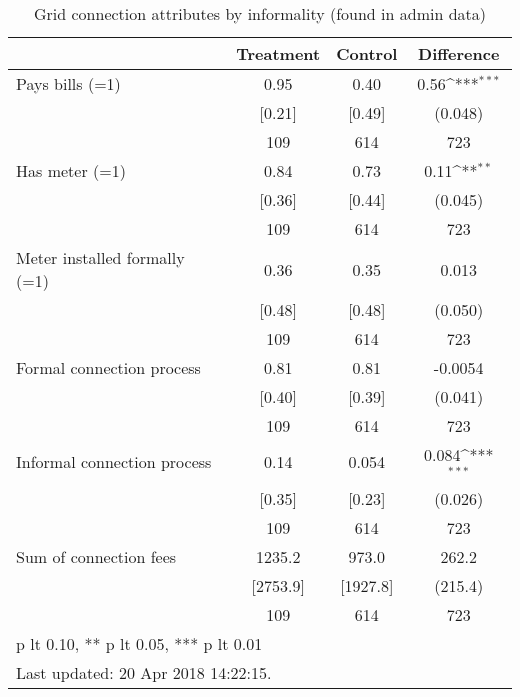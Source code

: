 \begin{table}[htbp]\centering
\def\sym#1{\ifmmode^{#1}\else\(^{#1}\)\fi}
\caption{Grid connection attributes by informality (found in admin data) \label{tab:"balance"}}
\begin{tabular*}{0.9\hsize}{@{\hskip\tabcolsep\extracolsep\fill}l*{1}{ccc}}
\toprule
                                &Treatment&  Control&Difference         \\
\midrule
Pays bills (=1)                 &     0.95&     0.40&     0.56\sym{***}\\
                                &   [0.21]&   [0.49]&  (0.048)         \\
                                &      109&      614&      723         \\
Has meter (=1)                  &     0.84&     0.73&     0.11\sym{**} \\
                                &   [0.36]&   [0.44]&  (0.045)         \\
                                &      109&      614&      723         \\
Meter installed formally (=1)   &     0.36&     0.35&    0.013         \\
                                &   [0.48]&   [0.48]&  (0.050)         \\
                                &      109&      614&      723         \\
Formal connection process       &     0.81&     0.81&  -0.0054         \\
                                &   [0.40]&   [0.39]&  (0.041)         \\
                                &      109&      614&      723         \\
Informal connection process     &     0.14&    0.054&    0.084\sym{***}\\
                                &   [0.35]&   [0.23]&  (0.026)         \\
                                &      109&      614&      723         \\
Sum of connection fees          &   1235.2&    973.0&    262.2         \\
                                & [2753.9]& [1927.8]&  (215.4)         \\
                                &      109&      614&      723         \\
\bottomrule
\multicolumn{4}{l}{\footnotesize * p lt 0.10, ** p lt 0.05, *** p lt 0.01}\\
\multicolumn{4}{l}{\footnotesize Last updated: 20 Apr 2018 14:22:15.}\\
\end{tabular*}
\end{table}
